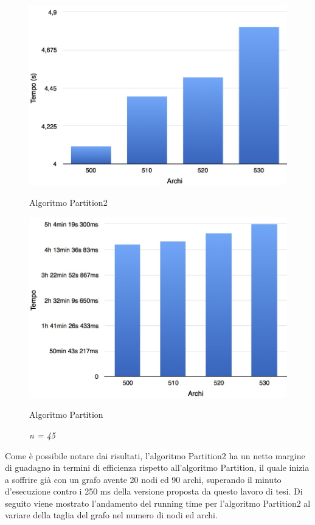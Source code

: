 \begin{figure}[h!]
	\vspace*{1cm}
	\begin{minipage}{0.40\textwidth}
		\centering
		\includegraphics[scale=.25]{img/beta4/45_4.jpg}
		\caption{Algoritmo Partition2}
	\end{minipage}\hfill
	\begin{minipage}{0.40\textwidth}
		\centering
		\includegraphics[scale=.25]{img/iole_beta4/iole_45_4.jpg}
		\caption{Algoritmo Partition}
	\end{minipage}
	\caption*{\textit{n = 45}}
\end{figure}
Come è possibile notare dai risultati, l'algoritmo Partition2 ha un netto margine di guadagno in termini di efficienza rispetto all'algoritmo Partition, il quale inizia a soffrire già con un grafo avente 20 nodi ed 90 archi, superando il minuto d'esecuzione contro i 250 ms della versione proposta da questo lavoro di tesi. Di seguito viene mostrato l'andamento del running time per l'algoritmo Partition2 al variare della taglia del grafo nel numero di nodi ed archi. 
